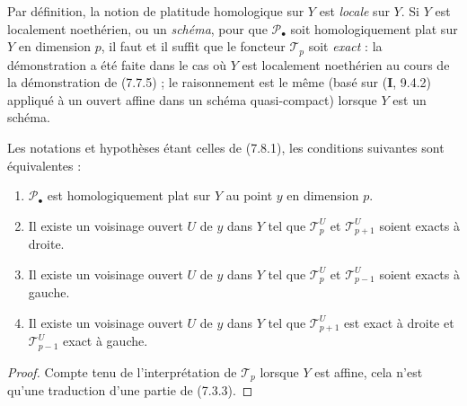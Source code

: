 \begin{env}[7.8.2]
Par définition, la notion de platitude homologique sur $Y$ est \emph{locale} sur
$Y$. Si $Y$ est localement noethérien, ou un \emph{schéma}, pour que
$\mathscr P_\bullet$ soit homologiquement plat sur $Y$ en dimension $p$, il faut
et il suffit que le foncteur $\mathscr T_p$ soit \emph{exact} : la démonstration
a été faite dans le cas où $Y$ est localement noethérien au cours de la
démonstration de (7.7.5) ; le raisonnement est le même (basé sur (\textbf{I}, 9.4.2)
appliqué à un ouvert affine dans un schéma quasi-compact) lorsque $Y$ est un
schéma.
\end{env}

\begin{proposition}[7.8.3]
Les notations et hypothèses étant celles de \textup{(7.8.1)}, les conditions suivantes
sont équivalentes :
\begin{enumerate}
  \item[\textup{a)}] $\mathscr P_\bullet$ est homologiquement plat sur $Y$ au point $y$
    en dimension $p$.
  \item[\textup{b)}] Il existe un voisinage ouvert $U$ de $y$ dans $Y$ tel que
    $\mathscr T_p^U$ et $\mathscr T_{p+1}^U$ soient exacts à droite.
  \item[\textup{c)}] Il existe un voisinage ouvert $U$ de $y$ dans $Y$ tel que
    $\mathscr T_p^U$ et $\mathscr T_{p-1}^U$ soient exacts à gauche.
  \item[\textup{d)}] Il existe un voisinage ouvert $U$ de $y$ dans $Y$ tel que
    $\mathscr T_{p+1}^U$ est exact à droite et $\mathscr T_{p-1}^U$ exact à
    gauche.
\end{enumerate}
\end{proposition}

\begin{proof}
Compte tenu de l'interprétation de $\mathscr T_p$ lorsque $Y$ est affine, cela
n'est qu'une traduction d'une partie de (7.3.3).
\end{proof}

